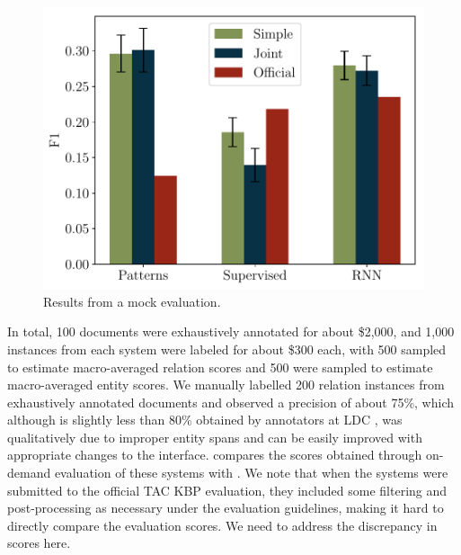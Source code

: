 \begin{figure}[t]
  \centering
  \includegraphics[width=\columnwidth]{figures/kbp2016/kbp2016_f1}
  \caption{\label{fig:evaluation-results} Results from a mock evaluation.}
\end{figure}
In total, 100 documents were exhaustively annotated for about \$2,000, and 1,000 instances from each system were labeled for about \$300 each, with 500 sampled to estimate macro-averaged relation scores and 500 were sampled to estimate macro-averaged entity scores. We manually labelled 200 relation instances from exhaustively annotated documents and observed a precision of about 75\%, which although is slightly less than 80\% obtained by annotators at LDC \cite{ellis2015overview}, was qualitatively due to improper entity spans and can be easily improved with appropriate changes to the interface. 
 compares the scores obtained through on-demand evaluation of these systems with .
We note that when the systems were submitted to the official TAC KBP evaluation, they included some filtering and post-processing as necessary under the evaluation guidelines, making it hard to directly compare the evaluation scores.
\ac{We need to address the discrepancy in scores here.}

